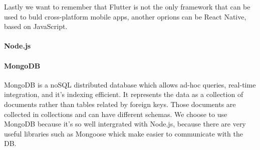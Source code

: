 Lastly we want to remember that Flutter is not the only framework that can be used to buld cross-platform mobile apps, another oprions can be React Native, based on JavaScript.


\paragraph{Node.js}


\paragraph{MongoDB}
MongoDB is a noSQL distributed database which allows ad-hoc queries, real-time integration, and it's indexing efficient. It represents the data as a collection of documents rather than tables related by foreign keys. Those documents are collected in collections and can have different schemas. We choose to use MongoDB because it's so well intergrated with Node.js, because there are very useful libraries such as Mongoose whick make easier to communicate with the DB.
